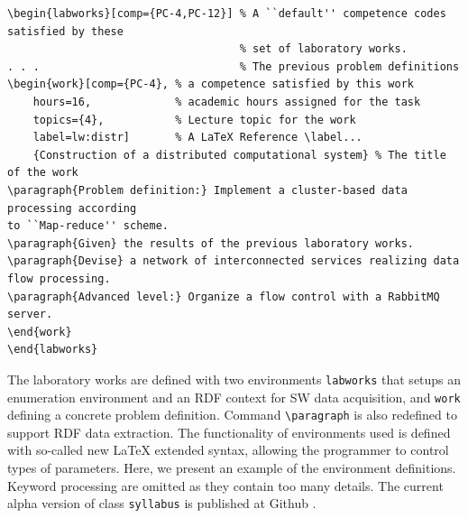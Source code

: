 \documentclass[
]{aiitart}
\begin{document}
\begin{verbatim}
\begin{labworks}[comp={PC-4,PC-12}] % A ``default'' competence codes satisfied by these
                                    % set of laboratory works.
. . .                               % The previous problem definitions
\begin{work}[comp={PC-4}, % a competence satisfied by this work
    hours=16,             % academic hours assigned for the task
    topics={4},           % Lecture topic for the work
    label=lw:distr]       % A LaTeX Reference \label...
    {Construction of a distributed computational system} % The title of the work
\paragraph{Problem definition:} Implement a cluster-based data processing according
to ``Map-reduce'' scheme.
\paragraph{Given} the results of the previous laboratory works.
\paragraph{Devise} a network of interconnected services realizing data flow processing.
\paragraph{Advanced level:} Organize a flow control with a RabbitMQ server.
\end{work}
\end{labworks}
\end{verbatim}

The laboratory works are defined with two environments \verb|labworks| that setups an enumeration environment and an RDF context for SW data acquisition, and \verb|work| defining a concrete problem definition.  Command \verb|\paragraph| is also redefined to support RDF data extraction.  The functionality of environments used is defined with so-called new \LaTeX{} extended syntax, allowing the programmer to control types of parameters.  Here, we present an example of the environment definitions. Keyword processing are omitted as they contain too many details.  The current alpha version of class \verb|syllabus| is published at Github \cite{ghs}. %
\end{document}
